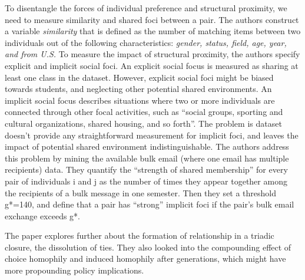 \documentclass[letterpaper,12pt]{article}
\theoremstyle{definition}
\begin{document}
To disentangle the forces of individual preference and structural proximity, we need to measure similarity and shared foci between a pair. The authors construct a variable \textit{similarity} that is defined as the number of matching items between two individuals out of the following characteristics: \textit{gender, status, field, age, year, and from U.S.} To measure the impact of structural proximity, the authors specify explicit and implicit social foci. An explicit social focus is measured as sharing at least one class in the dataset. However, explicit social foci might be biased towards students, and neglecting other potential shared environments. An implicit social focus describes situations where two or more individuals are connected through other focal activities, such as “social groups, sporting and cultural organizations, shared housing, and so forth”. The problem is dataset doesn’t provide any straightforward measurement for implicit foci, and leaves the impact of potential shared environment indistinguishable. The authors address this problem by mining the available bulk email (where one email has multiple recipients) data. They quantify the “strength of shared membership” for every pair of individuals i and j as the number of times they appear together among the recipients of a bulk message in one semester. Then they set a threshold g*=140, and define that a pair has “strong” implicit foci if the pair’s bulk email exchange exceeds g*.

The paper explores further about the formation of relationship in a triadic closure, the dissolution of ties. They also looked into the compounding effect of choice homophily and induced homophily after generations, which might have more propounding policy implications.
\end{document}
